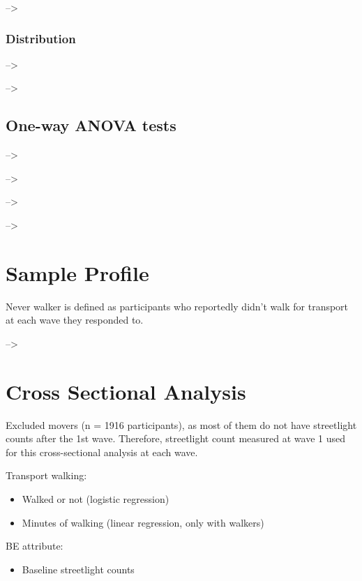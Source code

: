 \documentclass[
]{book}
\providecommand{\tightlist}{%
  \setlength{\itemsep}{0pt}\setlength{\parskip}{0pt}}
\begin{document}
--\textgreater{}

\hypertarget{distribution}{%
\subsection{Distribution}\label{distribution}}

--\textgreater{}

--\textgreater{}

\hypertarget{one-way-anova-tests}{%
\section{One-way ANOVA tests}\label{one-way-anova-tests}}

--\textgreater{}

--\textgreater{}

--\textgreater{}

--\textgreater{}

\hypertarget{sample-profile}{%
\chapter{Sample Profile}\label{sample-profile}}

Never walker is defined as participants who reportedly didn't walk for transport at each wave they responded to.

--\textgreater{}

\hypertarget{cross-sectional-analysis}{%
\chapter{Cross Sectional Analysis}\label{cross-sectional-analysis}}

Excluded movers (n = 1916 participants), as most of them do not have streetlight counts after the 1st wave. Therefore, streetlight count measured at wave 1 used for this cross-sectional analysis at each wave.

Transport walking:

\begin{itemize}
\tightlist
\item
  Walked or not (logistic regression)
\item
  Minutes of walking (linear regression, only with walkers)
\end{itemize}

BE attribute:

\begin{itemize}
\tightlist
\item
  Baseline streetlight counts
\end{itemize}
\end{document}
